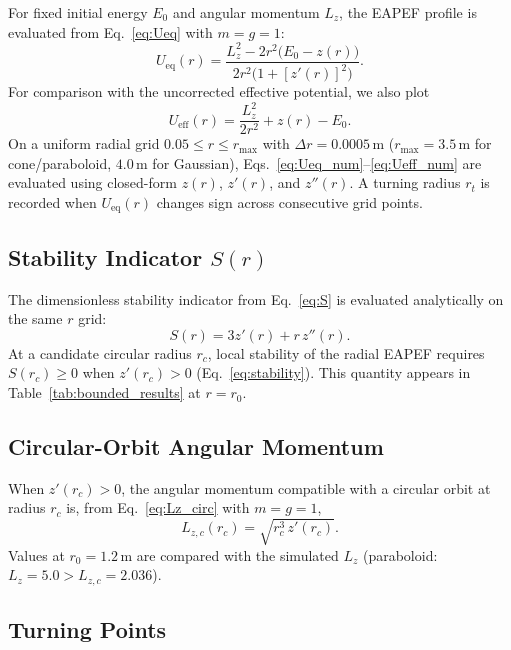 \documentclass[11pt,letterpaper]{article}
\begin{document}
For fixed initial energy $E_0$ and angular momentum $L_z$, the EAPEF profile is evaluated from Eq.~\eqref{eq:Ueq} with $m=g=1$:
\begin{equation}\label{eq:Ueq_num}
    U_{\mathrm{eq}}(r)
    = \frac{L_z^2 - 2r^2\bigl(E_0 - z(r)\bigr)}
           {2r^2\bigl(1 + [z'(r)]^2\bigr)}.
\end{equation}
For comparison with the uncorrected effective potential, we also plot
\begin{equation}\label{eq:Ueff_num}
    U_{\mathrm{eff}}(r) = \frac{L_z^2}{2r^2} + z(r) - E_0.
\end{equation}
On a uniform radial grid $0.05\le r\le r_{\max}$ with $\Delta r=0.0005\,\mathrm{m}$ ($r_{\max}=3.5\,\mathrm{m}$ for cone/paraboloid, $4.0\,\mathrm{m}$ for Gaussian), Eqs.~\eqref{eq:Ueq_num}--\eqref{eq:Ueff_num} are evaluated using closed-form $z(r)$, $z'(r)$, and $z''(r)$. A turning radius $r_t$ is recorded when $U_{\mathrm{eq}}(r)$ changes sign across consecutive grid points.

\subsection{Stability Indicator $S(r)$}
\label{sec:analysis_S}

The dimensionless stability indicator from Eq.~\eqref{eq:S} is evaluated analytically on the same $r$ grid:
\begin{equation}\label{eq:S_num}
    S(r) = 3z'(r) + r\,z''(r).
\end{equation}
At a candidate circular radius $r_c$, local stability of the radial EAPEF requires $S(r_c)\ge 0$ when $z'(r_c)>0$ (Eq.~\eqref{eq:stability}). This quantity appears in Table~\ref{tab:bounded_results} at $r=r_0$.

\subsection{Circular-Orbit Angular Momentum}
\label{sec:analysis_Lzc}

When $z'(r_c)>0$, the angular momentum compatible with a circular orbit at radius $r_c$ is, from Eq.~\eqref{eq:Lz_circ} with $m=g=1$,
\begin{equation}\label{eq:Lzc_num}
    L_{z,c}(r_c) = \sqrt{r_c^3\,z'(r_c)}.
\end{equation}
Values at $r_0=1.2\,\mathrm{m}$ are compared with the simulated $L_z$ (paraboloid: $L_z=5.0>L_{z,c}=2.036$).

\subsection{Turning Points}
\label{sec:analysis_turning}
\end{document}

